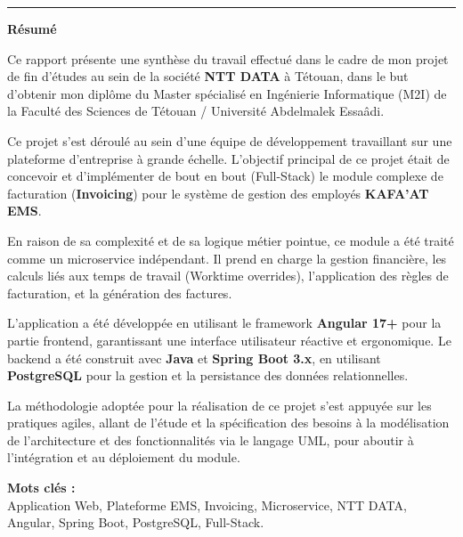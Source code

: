\documentclass[12pt, a4paper, openany]{report}
\begin{document}
\vspace*{0.5cm} %

\noindent
\textcolor{royalBlue}{\rule{0.65\textwidth}{1pt}}
\hfill
{\fontsize{24}{28}\selectfont\color{royalBlue}\bfseries Résumé}

\vspace{0.0cm}

\begin{large}
\setlength{\parskip}{0.3cm} %
\renewcommand{\baselinestretch}{1.3}\selectfont %

Ce rapport présente une synthèse du travail effectué dans le cadre de mon projet de fin d'études au sein de la société \textbf{NTT DATA} à Tétouan, dans le but d'obtenir mon diplôme du Master spécialisé en Ingénierie Informatique (M2I) de la Faculté des Sciences de Tétouan / Université Abdelmalek Essaâdi.

Ce projet s'est déroulé au sein d'une équipe de développement travaillant sur une plateforme d'entreprise à grande échelle. L'objectif principal de ce projet était de concevoir et d'implémenter de bout en bout (Full-Stack) le module complexe de facturation (\textbf{Invoicing}) pour le système de gestion des employés \textbf{KAFA'AT EMS}.

En raison de sa complexité et de sa logique métier pointue, ce module a été traité comme un microservice indépendant. Il prend en charge la gestion financière, les calculs liés aux temps de travail (Worktime overrides), l'application des règles de facturation, et la génération des factures.

L'application a été développée en utilisant le framework \textbf{Angular 17+} pour la partie frontend, garantissant une interface utilisateur réactive et ergonomique. Le backend a été construit avec \textbf{Java} et \textbf{Spring Boot 3.x}, en utilisant \textbf{PostgreSQL} pour la gestion et la persistance des données relationnelles.

La méthodologie adoptée pour la réalisation de ce projet s'est appuyée sur les pratiques agiles, allant de l'étude et la spécification des besoins à la modélisation de l'architecture et des fonctionnalités via le langage UML, pour aboutir à l'intégration et au déploiement du module.

\vspace{0cm}

\noindent\textbf{Mots clés :} \\
Application Web, Plateforme EMS, Invoicing, Microservice, NTT DATA, Angular, Spring Boot, PostgreSQL, Full-Stack.

\end{large}
\end{document}
